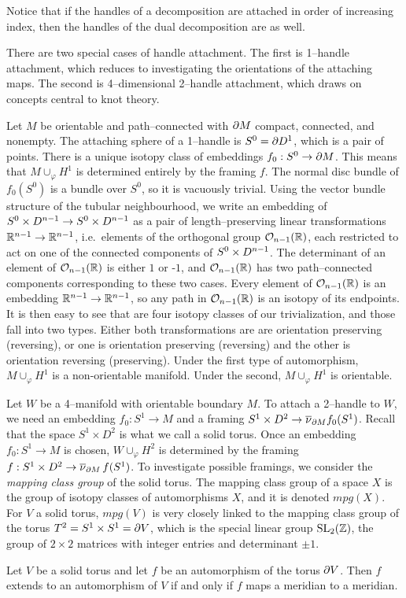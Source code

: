 Notice that if the handles of a decomposition are attached in order of increasing index, then the handles of the dual decomposition are as well.

There are two special cases of handle attachment.
The first is 1--handle attachment, which reduces to investigating the orientations of the attaching maps.
The second is 4--dimensional 2--handle attachment, which draws on concepts central to knot theory.

\begin{rmk}
	\label{rmk:1handle}
	Let $M$ be orientable and path--connected with $\partial M$ compact, connected, and nonempty.
	The attaching sphere of a 1--handle is $S^0=\partial D^1$, which is a pair of points.
	There is a unique isotopy class of embeddings $f_0:S^0\to\partial M$.
	This means that $M\cup_\varphi H^1$ is determined entirely by the framing $f$.
	The normal disc bundle of $f_0(S^0)$ is a bundle over $S^0$, so it is vacuously trivial.
	Using the vector bundle structure of the tubular neighbourhood, we write an embedding of $S^0\times D^{n-1}\to S^0\times D^{n-1}$ as a pair of length--preserving linear transformations $\mathbb{R}^{n-1}\to\mathbb{R}^{n-1}$, i.e.\ elements of the orthogonal group $\mathcal{O}_{n-1}({\mathbb{R}})$, each restricted to act on one of the connected components of $S^0\times D^{n-1}$.
	The determinant of an element of $\mathcal{O}_{n-1}({\mathbb{R}})$ is either $1$ or -$1$, and $\mathcal{O}_{n-1}({\mathbb{R}})$ has two path--connected components corresponding to these two cases.
	Every element of $\mathcal{O}_{n-1}({\mathbb{R}})$ is an embedding $\mathbb{R}^{n-1}\to\mathbb{R}^{n-1}$, so any path in $\mathcal{O}_{n-1}({\mathbb{R}})$ is an isotopy of its endpoints.
	It is then easy to see that are four isotopy classes of our trivialization, and those fall into two types.
	Either both transformations are are orientation preserving (reversing), or one is orientation preserving (reversing) and the other is orientation reversing (preserving).
	Under the first type of automorphism, $M\cup_\varphi H^1$ is a non-orientable manifold.
	Under the second, $M\cup_\varphi H^1$ is orientable.
\end{rmk}

Let $W$ be a 4--manifold with orientable boundary $M$.
To attach a 2--handle to $W$, we need an embedding $f_0:S^1\to M$ and a framing $S^1\times D^2\to\overline{\nu}_{\partial M}f_0(S^1)$.
Recall that the space $S^1\times D^2$ is what we call a solid torus.
Once an embedding $f_0:S^1\to M$ is chosen, $W\cup_\varphi H^2$ is determined by the framing $f:S^1\times D^2\to \overline{\nu}_{\partial M}\,f(S^1)$.
To investigate possible framings, we consider the \emph{mapping class group} of the solid torus.
The mapping class group of a space $X$ is the group of isotopy classes of automorphisms $X$, and it is denoted $mpg(X)$.
For $V$ a solid torus, $mpg(V)$ is very closely linked to the mapping class group of the torus $T^2 = S^1\times S^1=\partial V$, which is the special linear group $\textrm{SL}_2(\mathbb{Z})$, the group of $2\times 2$ matrices with integer entries and determinant $\pm 1$.
\begin{lem}
	Let $V$ be a solid torus and let $f$ be an automorphism of the torus $\partial V$.
	Then $f$ extends to an automorphism of $V$ if and only if $f$ maps a meridian to a meridian.	
\end{lem}

